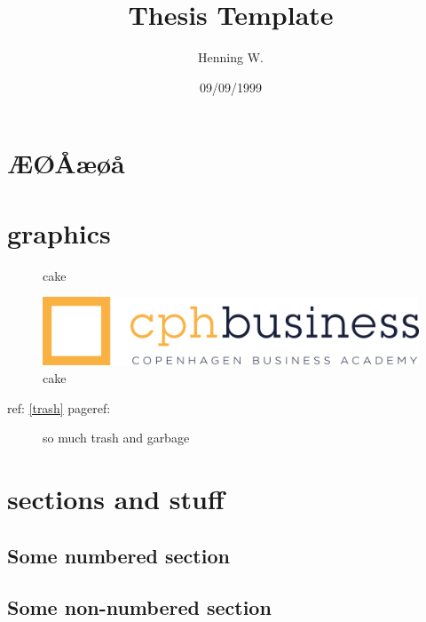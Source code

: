 \documentclass[a4paper, 12pt]{report}
\begin{document}
\title{\Large{\textbf{Thesis Template}}}
\author{Henning W.}
\date{09/09/1999}
\maketitle
\tableofcontents
\setcounter{page}{2}
\fancyhf{}
\renewcommand{\headrulewidth}{2pt}
\renewcommand{\headrulewidth}{2pt}
\fancyhead{\leftmark}
\fancyfoot{\thepage}
\chapter{ÆØÅæøå}
\chapter{graphics}

\begin{figure}[ht]
\centering
\caption{cake}
\includegraphics[width=12cm]{cph_logo.png}
\caption{cake}
\label{trash}
\label{praise kek}
\end{figure}
ref:
\ref{trash}
pageref:
\pageref{trash}
\begin{figure}[!tbp]
  \centering
  \hfill
  \caption{so much trash and garbage}
\end{figure}

\chapter{sections and stuff}

\section{Some numbered section}
\section*{Some non-numbered section}
\end{document}
